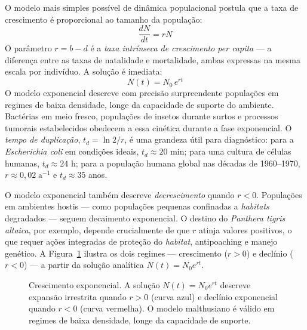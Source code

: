 O modelo mais simples possível de dinâmica populacional postula que a taxa de
crescimento é proporcional ao tamanho da população:
\begin{equation}
\frac{dN}{dt} = r N
\end{equation}
O parâmetro $r = b - d$ é a \emph{taxa intrínseca de crescimento per capita} --- a
diferença entre as taxas de natalidade e mortalidade, ambas expressas na
mesma escala por indivíduo. A solução é imediata:
\begin{equation}
N(t) = N_0\, e^{rt}
\end{equation}
O modelo exponencial descreve com precisão surpreendente populações em regimes
de baixa densidade, longe da capacidade de suporte do ambiente. Bactérias em
meio fresco, populações de insetos durante surtos e processos tumorais
estabelecidos obedecem a essa cinética durante a fase exponencial. O
\emph{tempo de duplicação}, $t_d = \ln 2 / r$, é uma grandeza útil para
diagnóstico: para a \textit{Escherichia coli} em condições ideais, $t_d \approx
20$ min; para uma cultura de células humanas, $t_d \approx 24$ h; para a
população humana global nas décadas de 1960--1970, $r \approx 0{,}02\;\mathrm{a}^{-1}$
e $t_d \approx 35$ anos.

O modelo exponencial também descreve \emph{decrescimento} quando $r < 0$.
Populações em ambientes hostis --- como populações pequenas confinadas a
\emph{habitats} degradados --- seguem decaimento exponencial. O destino do
\emph{Panthera tigris altaica}, por exemplo, depende crucialmente de que $r$
atinja valores positivos, o que requer ações integradas de proteção do
\emph{habitat}, antipoaching e manejo genético. A Figura~\ref{fig:10-exponencial}
ilustra os dois regimes --- crescimento ($r>0$) e declínio ($r<0$) --- a partir
da solução analítica $N(t) = N_0 e^{rt}$.

\begin{figure}[htbp]
\centering
{}
\caption{Crescimento exponencial. A solução $N(t) = N_0 e^{rt}$ descreve expansão irrestrita quando $r>0$ (curva azul) e declínio exponencial quando $r<0$ (curva vermelha). O modelo malthusiano é válido em regimes de baixa densidade, longe da capacidade de suporte.}
\label{fig:10-exponencial}
\end{figure}

